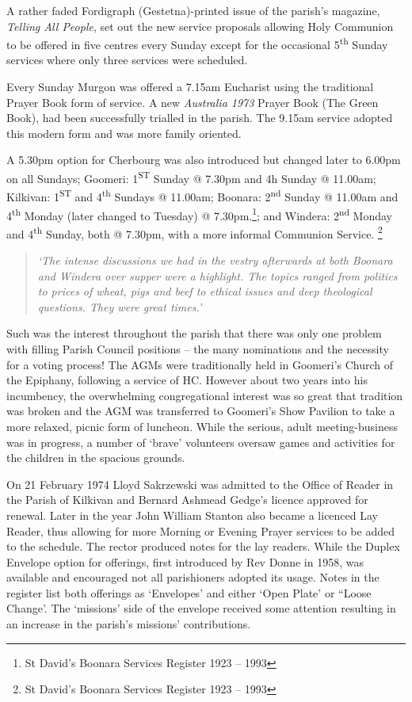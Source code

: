 A rather faded Fordigraph (Gestetna)-printed issue of the parish's
magazine, \emph{Telling All People}, set out the new service proposals
allowing Holy Communion to be offered in five centres every Sunday
except for the occasional 5\textsuperscript{th} Sunday services where
only three services were scheduled.

Every Sunday Murgon was offered a 7.15am Eucharist using the traditional
Prayer Book form of service. A new \emph{Australia 1973} Prayer Book
(The Green Book), had been successfully trialled in the parish. The
9.15am service adopted this modern form and was more family oriented.

A 5.30pm option for Cherbourg was also introduced but changed later to
6.00pm on all Sundays; Goomeri: 1\textsuperscript{ST} Sunday @ 7.30pm
and 4h Sunday @ 11.00am; Kilkivan: 1\textsuperscript{ST} and
4\textsuperscript{th} Sundays @ 11.00am; Boonara: 2\textsuperscript{nd}
Sunday @ 11.00am and 4\textsuperscript{th} Monday (later changed to
Tuesday) @ 7.30pm.\footnote{St David's Boonara Services Register 1923 --
  1993}; and Windera: 2\textsuperscript{nd} Monday and
4\textsuperscript{th} Sunday, both @ 7.30pm, with a more informal
Communion Service. \footnote{St David's Boonara Services Register 1923
  -- 1993}

\begin{quote}
\emph{`The intense discussions we had in the vestry afterwards at both
Boonara and Windera over supper were a highlight. The topics ranged from
politics to prices of wheat, pigs and beef to ethical issues and deep
theological questions. They were great times.'}
\end{quote}

Such was the interest throughout the parish that there was only one
problem with filling Parish Council positions -- the many nominations
and the necessity for a voting process! The AGMs were traditionally held
in Goomeri's Church of the Epiphany, following a service of HC. However
about two years into his incumbency, the overwhelming congregational
interest was so great that tradition was broken and the AGM was
transferred to Goomeri's Show Pavilion to take a more relaxed, picnic
form of luncheon. While the serious, adult meeting-business was in
progress, a number of `brave' volunteers oversaw games and activities
for the children in the spacious grounds.

On 21 February 1974 Lloyd Sakrzewski was admitted to the Office of
Reader in the Parish of Kilkivan and Bernard Ashmead Gedge's licence
approved for renewal. Later in the year John William Stanton also became
a licenced Lay Reader, thus allowing for more Morning or Evening Prayer
services to be added to the schedule. The rector produced notes for the
lay readers. While the Duplex Envelope option for offerings, first
introduced by Rev Donne in 1958, was available and encouraged not all
parishioners adopted its usage. Notes in the register list both
offerings as `Envelopes' and either `Open Plate' or ``Loose Change'. The
`missions' side of the envelope received some attention resulting in an
increase in the parish's missions' contributions.





